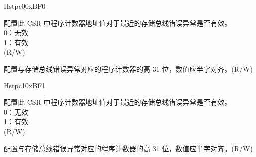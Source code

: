 \begin{register}{H}{stpc0}{0xBF0}\label{regdesc:STPC0}%
%
%
\regnewline%
\begin{regdesc}\begin{reglist}
\label{fielddesc:STPC0_VLD}\item [VLD] 配置此 CSR 中程序计数器地址值对于最近的存储总线错误异常是否有效。\\
0：无效\\
1：有效\\
(R/W)
\label{fielddesc:STPC0_ADDR}\item [{ADDR}] 配置与存储总线错误异常对应的程序计数器的高 31 位，数值应半字对齐。(R/W)
\end{reglist}\end{regdesc}
\end{register}

\begin{register}{H}{stpc1}{0xBF1}\label{regdesc:STPC1}%
%
%
\regnewline%
\begin{regdesc}\begin{reglist}
\label{fielddesc:STPC1_VLD}\item [VLD] 配置此 CSR 中程序计数器地址值对于最近的存储总线错误异常是否有效。\\
0：无效\\
1：有效\\
(R/W)
\label{fielddesc:STPC1_ADDR}\item [{ADDR}] 配置与存储总线错误异常对应的程序计数器的高 31 位，数值应半字对齐。(R/W)
\end{reglist}\end{regdesc}
\end{register}

